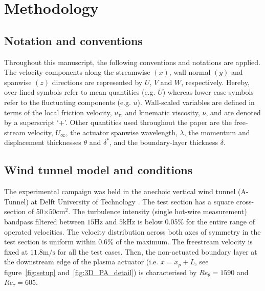 \section{Methodology \label{s:methodology}}%
%
\subsection{Notation and conventions}%
Throughout this manuscript, the following conventions and notations are applied. The velocity components along the streamwise $(x)$, wall-normal $(y)$ and spanwise $(z)$ directions are represented by $U$, $V$ and $W$, respectively. Hereby, over-lined symbols refer to mean quantities (e.g. $\overline{U}$) whereas lower-case symbols refer to the fluctuating components (e.g. $u$). Wall-scaled variables are defined in terms of the local friction velocity, $u_\tau$, and kinematic viscosity, $\nu$, and are denoted by a superscript ‘+’. Other quantities used throughout the paper are the free-stream velocity, $U_\infty$, the actuator spanwise wavelength, $\lambda$, the momentum and displacement thicknesses $\theta$ and $\delta^*$, and the boundary-layer thickness $\delta$. 

\subsection{Wind tunnel model and conditions \label{ss:WTandBLcond}}%
The experimental campaign was held in the anechoic vertical wind tunnel (A-Tunnel) at Delft University of Technology \citep{MerinoMartinez2020}. The test section has a square cross-section of 50$\times 50 \mathrm{cm}^2$. The turbulence intensity (single hot-wire measurement) bandpass filtered between $15\mathrm{Hz}$ and $5\mathrm{kHz}$ is below 0.05\% for the entire range of operated velocities. The velocity distribution across both axes of symmetry in the test section is uniform within 0.6\% of the maximum. The  freestream velocity is fixed at $11.8\mathrm{m/s}$ for all the test cases. Then, the non-actuated boundary layer at the downstream edge of the plasma actuator (i.e. %
$x = x_p+L$, see figure~\ref{fig:setup} and~\ref{fig:3D_PA_detail}) is characterised by $Re_\theta = 1590$ and $Re_\tau = 605$.

